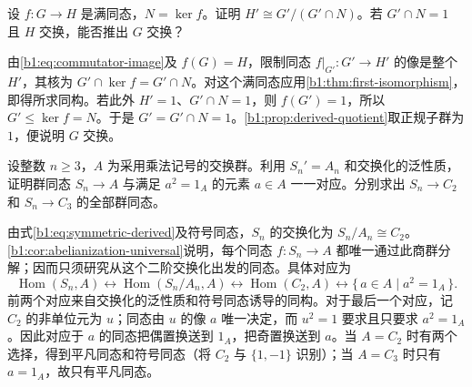 \begin{exercise}\label{b1:ex:07-derived-map}
	设 \(f:G\to H\) 是满同态，\(N=\ker f\)。证明 \(H'\cong G'/(G'\cap N)\)。若 \(G'\cap N=1\) 且 \(H\) 交换，能否推出 \(G\) 交换？
\end{exercise}
\begin{solution}
	由\eqref{b1:eq:commutator-image}及 \(f(G)=H\)，限制同态 \(f|_{G'}:G'\to H'\) 的像是整个 \(H'\)，其核为 \(G'\cap\ker f=G'\cap N\)。对这个满同态应用\cref{b1:thm:first-isomorphism}，即得所求同构。若此外 \(H'=1\)、\(G'\cap N=1\)，则 \(f(G')=1\)，所以 \(G'\leq\ker f=N\)。于是 \(G'=G'\cap N=1\)。\cref{b1:prop:derived-quotient}取正规子群为 \(1\)，便说明 \(G\) 交换。
\end{solution}

\begin{exercise}\label{b1:ex:07-abelianization-symmetric-homs}
	设整数 \(n\ge3\)，\(A\) 为采用乘法记号的交换群。利用 \(S_n'=A_n\) 和交换化的泛性质，证明群同态 \(S_n\rightarrow A\) 与满足 \(a^2=1_A\) 的元素 \(a\in A\) 一一对应。分别求出 \(S_n\rightarrow C_2\) 和 \(S_n\rightarrow C_3\) 的全部群同态。
\end{exercise}
\begin{solution}
	由式\eqref{b1:eq:symmetric-derived}及符号同态，\(S_n\) 的交换化为 \(S_n/A_n\cong C_2\)。\cref{b1:cor:abelianization-universal}说明，每个同态 \(f:S_n\rightarrow A\) 都唯一通过此商群分解；因而只须研究从这个二阶交换化出发的同态。具体对应为
	\[
		\operatorname{Hom}(S_n,A) \longleftrightarrow \operatorname{Hom}(S_n/A_n,A) \longleftrightarrow \operatorname{Hom}(C_2,A) \longleftrightarrow \{\,a\in A\mid a^2=1_A\,\}.
	\]
	前两个对应来自交换化的泛性质和符号同态诱导的同构。对于最后一个对应，记 \(C_2\) 的非单位元为 \(u\)；同态由 \(u\) 的像 \(a\) 唯一决定，而 \(u^2=1\) 要求且只要求 \(a^2=1_A\)。因此对应于 \(a\) 的同态把偶置换送到 \(1_A\)，把奇置换送到 \(a\)。当 \(A=C_2\) 时有两个选择，得到平凡同态和符号同态（将 \(C_2\) 与 \(\{1,-1\}\) 识别）；当 \(A=C_3\) 时只有 \(a=1_A\)，故只有平凡同态。
\end{solution}

